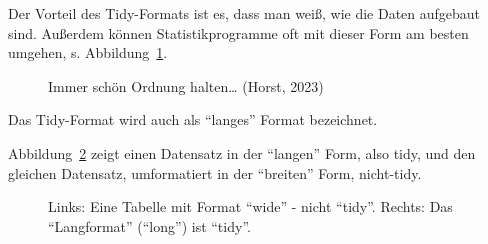 \documentclass[
  letterpaper,
]{scrbook}
\theoremstyle{definition}
\theoremstyle{definition}
\theoremstyle{definition}
\theoremstyle{remark}
\begin{document}
Der Vorteil des Tidy-Formats ist es, dass man weiß, wie die Daten
aufgebaut sind. Außerdem können Statistikprogramme oft mit dieser Form
am besten umgehen, s. Abbildung~\ref{fig-tidy3}.

\begin{figure}


\caption{\label{fig-tidy3}Immer schön Ordnung halten\ldots{} (Horst,
2023)}

\end{figure}%

Das Tidy-Format wird auch als ``langes'' Format bezeichnet.

Abbildung~\ref{fig-long-wide-anim} zeigt einen Datensatz in der
``langen'' Form, also tidy, und den gleichen Datensatz, umformatiert in
der ``breiten'' Form, nicht-tidy.

\begin{figure}


\caption{\label{fig-long-wide-anim}Links: Eine Tabelle mit Format
``wide'' - nicht ``tidy''. Rechts: Das ``Langformat'' (``long'') ist
``tidy''.}

\end{figure}%
\end{document}
